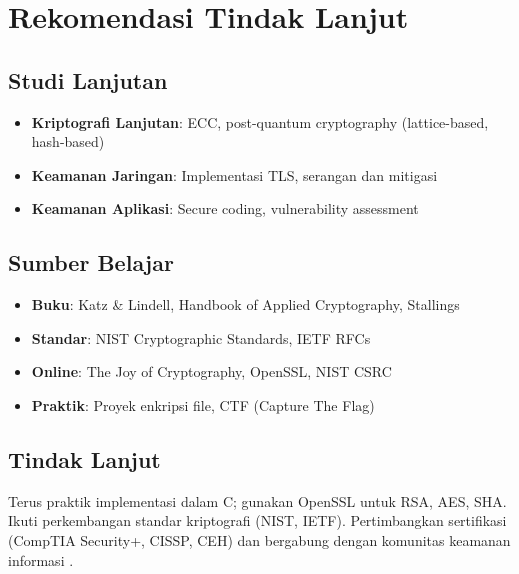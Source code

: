 ﻿\section{Rekomendasi Tindak Lanjut}

\subsection{Studi Lanjutan}

\begin{itemize}
  \item \textbf{Kriptografi Lanjutan}: ECC, post-quantum cryptography (lattice-based, hash-based)
  \item \textbf{Keamanan Jaringan}: Implementasi TLS, serangan dan mitigasi
  \item \textbf{Keamanan Aplikasi}: Secure coding, vulnerability assessment
\end{itemize}

\subsection{Sumber Belajar}

\begin{itemize}
  \item \textbf{Buku}: Katz \& Lindell, Handbook of Applied Cryptography, Stallings
  \item \textbf{Standar}: NIST Cryptographic Standards, IETF RFCs
  \item \textbf{Online}: The Joy of Cryptography, OpenSSL, NIST CSRC
  \item \textbf{Praktik}: Proyek enkripsi file, CTF (Capture The Flag)
\end{itemize}

\subsection{Tindak Lanjut}

Terus praktik implementasi dalam C; gunakan OpenSSL untuk RSA, AES, SHA. Ikuti perkembangan standar kriptografi (NIST, IETF). Pertimbangkan sertifikasi (CompTIA Security+, CISSP, CEH) dan bergabung dengan komunitas keamanan informasi \cite{stallings2017}.

